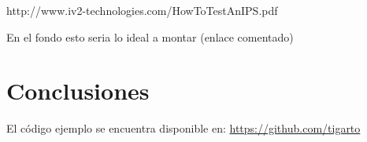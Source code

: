 \documentclass[12pt]{article}
\begin{document}


http://www.iv2-technologies.com/HowToTestAnIPS.pdf

En el fondo esto seria lo ideal a montar (enlace comentado)

\section{Conclusiones}




El código ejemplo se encuentra disponible en: \url{https://github.com/tigarto}



\end{document}

